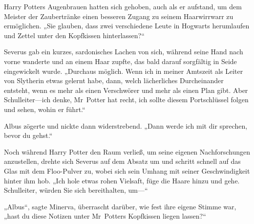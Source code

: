 Harry Potters Augenbrauen hatten sich gehoben, auch als er aufstand, um dem Meister der Zaubertränke einen besseren Zugang zu seinem Haarwirrwarr zu ermöglichen.
„Sie glauben, dass zwei verschiedene Leute in Hogwarts herumlaufen und Zettel unter den Kopfkissen hinterlassen?“

Severus gab ein kurzes, sardonisches Lachen von sich, während seine Hand nach vorne wanderte und an einem Haar zupfte, das bald darauf sorgfältig in Seide eingewickelt wurde.
„Durchaus möglich. Wenn ich in meiner Amtszeit als Leiter von Slytherin etwas gelernt habe, dann, welch lächerliches Durcheinander entsteht, wenn es mehr als einen Verschwörer und mehr als einen Plan gibt. Aber Schulleiter—ich denke, Mr~Potter hat recht, ich sollte diesem Portschlüssel folgen und sehen, wohin er führt.“

Albus zögerte und nickte dann widerstrebend. „Dann werde ich mit dir sprechen, bevor du gehst.“

\later

Noch während Harry Potter den Raum verließ, um seine eigenen Nachforschungen anzustellen, drehte sich Severus auf dem Absatz um und schritt schnell auf das Glas mit dem Floo-Pulver zu, wobei sich sein Umhang mit seiner Geschwindigkeit hinter ihm hob. „Ich hole etwas rohen Vielsaft, füge die Haare hinzu und gehe. Schulleiter, würden Sie sich bereithalten, um—“

„Albus“, sagte Minerva, überrascht darüber, wie fest ihre eigene Stimme war, „hast du diese Notizen unter Mr~Potters Kopfkissen liegen lassen?“

